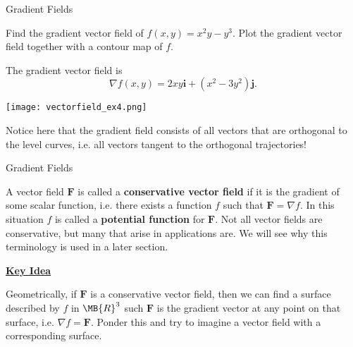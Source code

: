 \documentclass[11pt,english,
handout
]{beamer}
\begin{document}
\begin{frame}[t]{Gradient Fields}
\small
\begin{example}
Find the gradient vector field of $f(x,y)=x^2y-y^3$. Plot the gradient vector field together with a contour map of $f$.\pause 

\lspace
\begin{minipage}{0.5\textwidth}
The gradient vector field is 
\[
\nabla f(x,y)=2xy\mathbf{i}+(x^2-3y^2)\mathbf{j}.
\]
\end{minipage}%
\begin{minipage}{0.5\textwidth}
\centering
\texttt{[image: vectorfield\_ex4.png]}
\end{minipage}

\lspace
Notice here that the gradient field consists of all vectors that are orthogonal to the level curves, i.e. all vectors tangent to the orthogonal trajectories!
\end{example}
\end{frame}













\begin{frame}[t]{Gradient Fields}
\small
\begin{definition}
A vector field $\mathbf{F}$ is called a \textbf{conservative vector field} if it is the gradient of some scalar function, i.e. there exists a function $f$ such that $\mathbf{F}=\nabla f$. \pause In this situation $f$ is called a \textbf{potential function} for $\mathbf{F}$. \pause Not all vector fields are conservative, but many that arise in applications are. We will see why this terminology is used in a later section.
\end{definition}\pause

\begin{center}
\uline{\textbf{Key Idea}}
\end{center}

Geometrically, if $\mathbf{F}$ is a conservative vector field, then we can find a surface described by $f$ in $\MB{R}^3$ such $\mathbf{F}$ is the gradient vector at any point on that surface, i.e. $\nabla f=\mathbf{F}$. Ponder this and try to imagine a vector field with a corresponding surface.
\end{frame}
\end{document}

